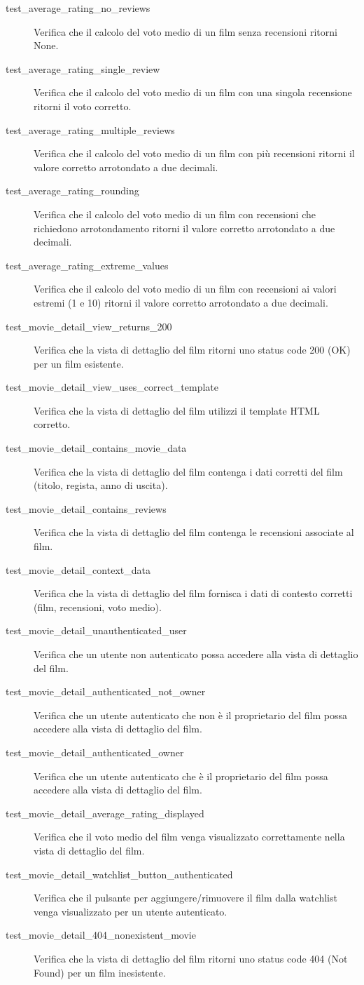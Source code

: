 \documentclass[12pt,a4paper]{report}
\begin{document}
\begin{description}
    \item[test\_average\_rating\_no\_reviews] Verifica che il calcolo del voto medio di un film senza recensioni ritorni None.
    \item[test\_average\_rating\_single\_review] Verifica che il calcolo del voto medio di un film con una singola recensione ritorni il voto corretto.
    \item[test\_average\_rating\_multiple\_reviews] Verifica che il calcolo del voto medio di un film con più recensioni ritorni il valore corretto arrotondato a due decimali.
    \item[test\_average\_rating\_rounding] Verifica che il calcolo del voto medio di un film con recensioni che richiedono arrotondamento ritorni il valore corretto arrotondato a due decimali.
    \item[test\_average\_rating\_extreme\_values] Verifica che il calcolo del voto medio di un film con recensioni ai valori estremi (1 e 10) ritorni il valore corretto arrotondato a due decimali.
    \item[test\_movie\_detail\_view\_returns\_200] Verifica che la vista di dettaglio del film ritorni uno status code 200 (OK) per un film esistente.
    \item[test\_movie\_detail\_view\_uses\_correct\_template] Verifica che la vista di dettaglio del film utilizzi il template HTML corretto.
    \item[test\_movie\_detail\_contains\_movie\_data] Verifica che la vista di dettaglio del film contenga i dati corretti del film (titolo, regista, anno di uscita).
    \item[test\_movie\_detail\_contains\_reviews] Verifica che la vista di dettaglio del film contenga le recensioni associate al film.
    \item[test\_movie\_detail\_context\_data] Verifica che la vista di dettaglio del film fornisca i dati di contesto corretti (film, recensioni, voto medio).
    \item[test\_movie\_detail\_unauthenticated\_user] Verifica che un utente non autenticato possa accedere alla vista di dettaglio del film.
    \item[test\_movie\_detail\_authenticated\_not\_owner] Verifica che un utente autenticato che non è il proprietario del film possa accedere alla vista di dettaglio del film.
    \item[test\_movie\_detail\_authenticated\_owner] Verifica che un utente autenticato che è il proprietario del film possa accedere alla vista di dettaglio del film.
    \item[test\_movie\_detail\_average\_rating\_displayed] Verifica che il voto medio del film venga visualizzato correttamente nella vista di dettaglio del film.
    \item[test\_movie\_detail\_watchlist\_button\_authenticated] Verifica che il pulsante per aggiungere/rimuovere il film dalla watchlist venga visualizzato per un utente autenticato.
    \item[test\_movie\_detail\_404\_nonexistent\_movie] Verifica che la vista di dettaglio del film ritorni uno status code 404 (Not Found) per un film inesistente.
\end{description}
\end{document}

